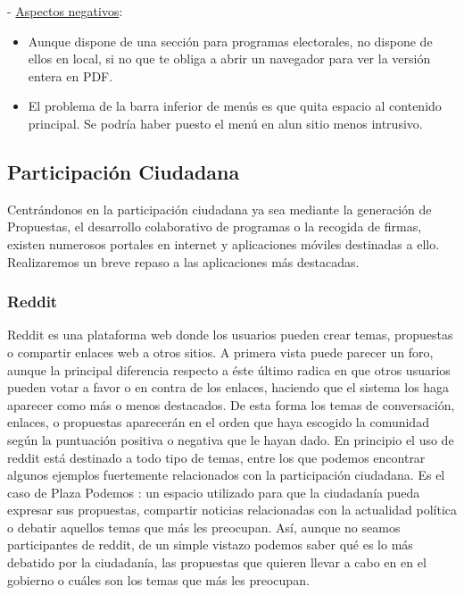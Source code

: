 - \underline{Aspectos negativos}:

\begin{itemize}
	\item Aunque dispone de una sección para programas electorales, no dispone de ellos en local, si no que te obliga a abrir un navegador para ver la versión entera en PDF.
	\item El problema de la barra inferior de menús es que quita espacio al contenido principal. Se podría haber puesto el menú en alun sitio menos intrusivo.
\end{itemize}

\subsection{Participación Ciudadana} \label{ssec:artProposals}

Centrándonos en la participación ciudadana ya sea mediante la generación de Propuestas, el desarrollo colaborativo de programas o la recogida de firmas, existen numerosos portales en internet y aplicaciones móviles destinadas a ello. Realizaremos un breve repaso a las aplicaciones más destacadas.

\subsubsection{Reddit}

Reddit \cite{ref:reddit} es una plataforma web donde los usuarios pueden crear temas, propuestas o compartir enlaces web a otros sitios. A primera vista puede parecer un foro, aunque la principal diferencia respecto a éste último radica en que otros usuarios pueden votar a favor o en contra de los enlaces, haciendo que el sistema los haga aparecer como más o menos destacados. De esta forma los temas de conversación, enlaces, o propuestas aparecerán en el orden que haya escogido la comunidad según la puntuación positiva o negativa que le hayan dado.
En principio el uso de reddit está destinado a todo tipo de temas, entre los que podemos encontrar algunos ejemplos fuertemente relacionados con la participación ciudadana. Es el caso de Plaza Podemos \cite{ref:plazaPodemos}: un espacio utilizado para que la ciudadanía pueda expresar sus propuestas, compartir noticias relacionadas con la actualidad política o debatir aquellos temas que más les preocupan. Así, aunque no seamos participantes de reddit, de un simple vistazo podemos saber qué es lo más debatido por la ciudadanía, las propuestas que quieren llevar a cabo en en el gobierno o cuáles son los temas que más les preocupan.

